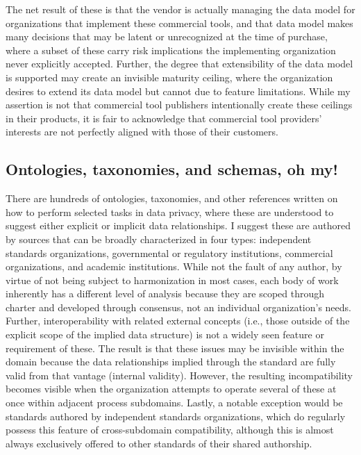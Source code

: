 \documentclass[10pt,letterpaper,twocolumn,twoside]{rho-class/rho}
\begin{document}
The net result of these is that the vendor is actually managing the data model for organizations that implement these commercial tools, and that data model makes many decisions that may be latent or unrecognized at the time of purchase, where a subset of these carry risk implications the implementing organization never explicitly accepted. Further, the degree that extensibility of the data model is supported may create an invisible maturity ceiling, where the organization desires to extend its data model but cannot due to feature limitations. While my assertion is not that commercial tool publishers intentionally create these ceilings in their products, it is fair to acknowledge that commercial tool providers' interests are not perfectly aligned with those of their customers.

\subsection{Ontologies, taxonomies, and schemas, oh my!}\label{sec:ontologies}

There are hundreds of ontologies, taxonomies, and other references written on how to perform selected tasks in data privacy, where these are understood to suggest either explicit or implicit data relationships. I suggest these are authored by sources that can be broadly characterized in four types: independent standards organizations, governmental or regulatory institutions, commercial organizations, and academic institutions. While not the fault of any author, by virtue of not being subject to harmonization in most cases, each body of work inherently has a different level of analysis because they are scoped through charter and developed through consensus, not an individual organization's needs. Further, interoperability with related external concepts (i.e., those outside of the explicit scope of the implied data structure) is not a widely seen  feature or requirement of these. The result is that these issues may be invisible within the domain because the data relationships implied through the standard are fully valid from that vantage (internal validity). However, the resulting incompatibility becomes visible when the organization attempts to operate several of these at once within adjacent process subdomains. Lastly, a notable exception would be standards authored by independent standards organizations, which do regularly possess this feature of cross-subdomain compatibility, although this is almost always exclusively offered to other standards of their shared authorship.
\end{document}
